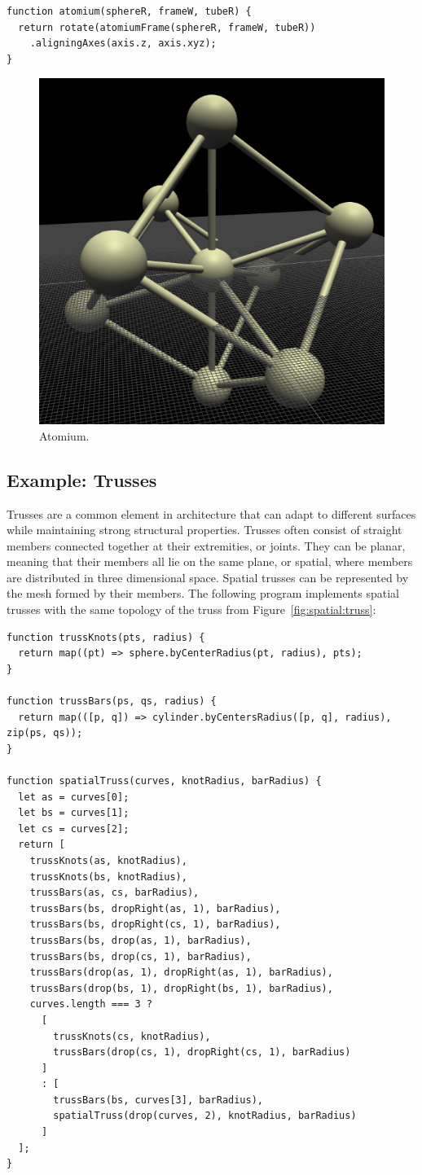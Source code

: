 \begin{verbatim}
function atomium(sphereR, frameW, tubeR) {
  return rotate(atomiumFrame(sphereR, frameW, tubeR))
    .aligningAxes(axis.z, axis.xyz);
}
\end{verbatim}

\begin{figure}
  \centering
  \includegraphics[width=0.6\linewidth]{./images/detail_examples/atomium_2_crop}
  \caption{Atomium.}
  \label{fig:ex:atomium}
\end{figure}


\subsection{Example: Trusses}
Trusses are a common element in architecture that can adapt to different surfaces while maintaining strong structural properties.
Trusses often consist of straight members connected together at their extremities, or joints.
They can be planar, meaning that their members all lie on the same plane, or spatial, where members are distributed in three dimensional space.
Spatial trusses can be represented by the mesh formed by their members.
The following program implements spatial trusses with the same topology of the truss from Figure~\ref{fig:spatial:truss}:

\begin{verbatim}
function trussKnots(pts, radius) {
  return map((pt) => sphere.byCenterRadius(pt, radius), pts);
}

function trussBars(ps, qs, radius) {
  return map(([p, q]) => cylinder.byCentersRadius([p, q], radius), zip(ps, qs));
}

function spatialTruss(curves, knotRadius, barRadius) {
  let as = curves[0];
  let bs = curves[1];
  let cs = curves[2];
  return [
    trussKnots(as, knotRadius),
    trussKnots(bs, knotRadius),
    trussBars(as, cs, barRadius),
    trussBars(bs, dropRight(as, 1), barRadius),
    trussBars(bs, dropRight(cs, 1), barRadius),
    trussBars(bs, drop(as, 1), barRadius),
    trussBars(bs, drop(cs, 1), barRadius),
    trussBars(drop(as, 1), dropRight(as, 1), barRadius),
    trussBars(drop(bs, 1), dropRight(bs, 1), barRadius),
    curves.length === 3 ?
      [
        trussKnots(cs, knotRadius),
        trussBars(drop(cs, 1), dropRight(cs, 1), barRadius)
      ]
      : [
        trussBars(bs, curves[3], barRadius),
        spatialTruss(drop(curves, 2), knotRadius, barRadius)
      ]
  ];
}
\end{verbatim}

